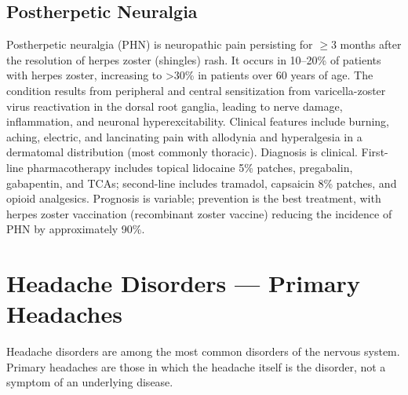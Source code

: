 \subsection{Postherpetic Neuralgia}
\label{sec:Postherpetic Neuralgia}
Postherpetic neuralgia (PHN) is neuropathic pain persisting for $\ge$3 months after the resolution of herpes zoster (shingles) rash. It occurs in 10--20\% of patients with herpes zoster, increasing to >30\% in patients over 60 years of age. The condition results from peripheral and central sensitization from varicella-zoster virus reactivation in the dorsal root ganglia, leading to nerve damage, inflammation, and neuronal hyperexcitability. Clinical features include burning, aching, electric, and lancinating pain with allodynia and hyperalgesia in a dermatomal distribution (most commonly thoracic). Diagnosis is clinical. First-line pharmacotherapy includes topical lidocaine 5\% patches, pregabalin, gabapentin, and TCAs; second-line includes tramadol, capsaicin 8\% patches, and opioid analgesics. Prognosis is variable; prevention is the best treatment, with herpes zoster vaccination (recombinant zoster vaccine) reducing the incidence of PHN by approximately 90\%.

\section{Headache Disorders --- Primary Headaches}








\label{sec:Headache Disorders --- Primary Headaches}

Headache disorders are among the most common disorders of the nervous system. Primary headaches are those in which the headache itself is the disorder, not a symptom of an underlying disease.

